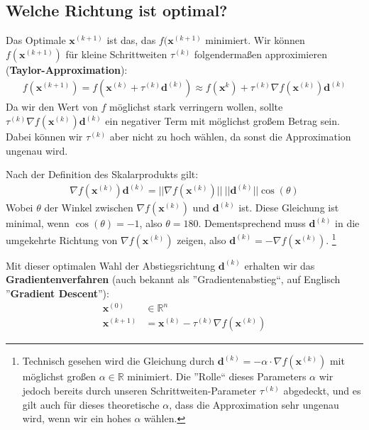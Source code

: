 \documentclass{report}
\newcommand{\tbf}{\textbf}
\newcommand*{\newpar}{\par\vspace{\baselineskip}\noindent}
\begin{document}
\subsection{Welche Richtung ist optimal?}
Das Optimale $\bm{x}^{(k+1)}$ ist das, das $f(\bm{x}^{(k+1)}$ minimiert. Wir können $f(\bm{x}^{(k+1)})$ für kleine Schrittweiten $\tau^{(k)}$ folgendermaßen approximieren (\tbf{Taylor-Approximation}):
\begin{align*}
f(\bm{x}^{(k+1)}) = f(\bm{x}^{(k)} + \tau^{(k)}\bm{d}^{(k)}) \approx f(\bm{x}^{k}) + \tau^{(k)} \nabla f(\bm{x}^{(k)})\bm{d}^{(k)}
\end{align*}
Da wir den Wert von $f$ möglichst stark verringern wollen, sollte $\tau^{(k)} \nabla f(\bm{x}^{(k)})\bm{d}^{(k)}$ ein negativer Term mit möglichst großem Betrag sein. Dabei können wir $\tau^{(k)}$ aber nicht zu hoch wählen, da sonst die Approximation ungenau wird.
\newpar
Nach der Definition des Skalarprodukts gilt:
\begin{align}
 \nabla f(\bm{x}^{(k)})\bm{d}^{(k)} = ||\nabla f(\bm{x}^{(k)})||\ ||\bm{d}^{(k)}|| \cos(\theta)
\end{align}
Wobei $\theta$ der Winkel zwischen $\nabla f(\bm{x}^{(k)})$ und $\bm{d}^{(k)}$ ist. Diese Gleichung ist minimal, wenn $\cos(\theta) = -1$, also $\theta = 180$. Dementsprechend muss $\bm{d}^{(k)}$ in die umgekehrte Richtung von $\nabla f(\bm{x}^{(k)})$ zeigen, also $\bm{d}^{(k)} = -\nabla f(\bm{x}^{(k)})$.
    \footnote{Technisch gesehen wird die Gleichung durch $\bm{d}^{(k)} = -\alpha \cdot \nabla f(\bm{x}^{(k)})$ mit möglichst großen $\alpha \in \mathbb{R}$ minimiert. Die ''Rolle`` dieses Parameters $\alpha$ wir jedoch bereits durch unseren Schrittweiten-Parameter $\tau^{(k)}$ abgedeckt, und es gilt auch für dieses theoretische $\alpha$, dass die Approximation sehr ungenau wird, wenn wir ein hohes $\alpha$ wählen.}
\newpar
Mit dieser optimalen Wahl der Abstiegsrichtung $\bm{d}^{(k)}$ erhalten wir das \tbf{Gradientenverfahren} (auch bekannt als ''Gradientenabstieg``, auf Englisch ''\tbf{Gradient Descent}''):
\begin{align*}
 \bm{x}^{(0)} &\in \mathbb{R}^n\\
 \bm{x}^{(k+1)} &= \bm{x}^{(k)} - \tau^{(k)} \nabla f(\bm{x}^{(k)})
\end{align*}
\end{document}
